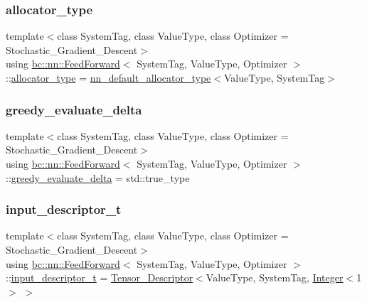 \subsubsection{\texorpdfstring{allocator\+\_\+type}{allocator\_type}}
{\footnotesize\ttfamily template$<$class System\+Tag, class Value\+Type, class Optimizer = Stochastic\+\_\+\+Gradient\+\_\+\+Descent$>$ \\
using \hyperlink{structbc_1_1nn_1_1FeedForward}{bc\+::nn\+::\+Feed\+Forward}$<$ System\+Tag, Value\+Type, Optimizer $>$\+::\hyperlink{structbc_1_1nn_1_1FeedForward_abacb25e939f5f9ac89fb49c88dd13043}{allocator\+\_\+type} =  \hyperlink{namespacebc_1_1nn_a0025752fc3f47f988b3fae106c825860}{nn\+\_\+default\+\_\+allocator\+\_\+type}$<$Value\+Type, System\+Tag$>$}

\mbox{\label{structbc_1_1nn_1_1FeedForward_a88c28010efe8e3b192bf94c57d26affe}} 
\subsubsection{\texorpdfstring{greedy\+\_\+evaluate\+\_\+delta}{greedy\_evaluate\_delta}}
{\footnotesize\ttfamily template$<$class System\+Tag, class Value\+Type, class Optimizer = Stochastic\+\_\+\+Gradient\+\_\+\+Descent$>$ \\
using \hyperlink{structbc_1_1nn_1_1FeedForward}{bc\+::nn\+::\+Feed\+Forward}$<$ System\+Tag, Value\+Type, Optimizer $>$\+::\hyperlink{structbc_1_1nn_1_1FeedForward_a88c28010efe8e3b192bf94c57d26affe}{greedy\+\_\+evaluate\+\_\+delta} =  std\+::true\+\_\+type}

\mbox{\label{structbc_1_1nn_1_1FeedForward_ab2b920592729859e37b474e4b0356c63}} 
\subsubsection{\texorpdfstring{input\+\_\+descriptor\+\_\+t}{input\_descriptor\_t}}
{\footnotesize\ttfamily template$<$class System\+Tag, class Value\+Type, class Optimizer = Stochastic\+\_\+\+Gradient\+\_\+\+Descent$>$ \\
using \hyperlink{structbc_1_1nn_1_1FeedForward}{bc\+::nn\+::\+Feed\+Forward}$<$ System\+Tag, Value\+Type, Optimizer $>$\+::\hyperlink{structbc_1_1nn_1_1FeedForward_ab2b920592729859e37b474e4b0356c63}{input\+\_\+descriptor\+\_\+t} =  \hyperlink{structbc_1_1nn_1_1Tensor__Descriptor}{Tensor\+\_\+\+Descriptor}$<$Value\+Type, System\+Tag, \hyperlink{structbc_1_1traits_1_1Integer}{Integer}$<$1$>$ $>$}

